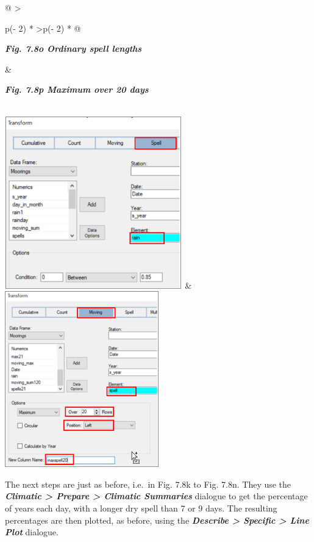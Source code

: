 \documentclass[
  letterpaper,
  DIV=11,
  numbers=noendperiod]{scrreprt}
\begin{document}
\begin{longtable}[]{@{}
  >{\raggedright\arraybackslash}p{(\columnwidth - 2\tabcolsep) * }
  >{\raggedleft\arraybackslash}p{(\columnwidth - 2\tabcolsep) * }@{}}
\toprule\noalign{}
\begin{minipage}[b]{\linewidth}\raggedright
\textbf{\emph{Fig. 7.8o Ordinary spell lengths}}
\end{minipage} & \begin{minipage}[b]{\linewidth}\raggedleft
\textbf{\emph{Fig. 7.8p Maximum over 20 days}}
\end{minipage} \\
\midrule\noalign{}
\endhead
\bottomrule\noalign{}
\endlastfoot
\includegraphics[width=3.02575in,height=2.94052in]{figures/Fig7.8o.png}
&
\includegraphics[width=2.63061in,height=2.99829in]{figures/Fig7.8p.png} \\
\end{longtable}

The next steps are just as before, i.e.~in Fig. 7.8k to Fig. 7.8n. They
use the \textbf{\emph{Climatic \textgreater{} Prepare \textgreater{}
Climatic Summaries}} dialogue to get the percentage of years each day,
with a longer dry spell than 7 or 9 days. The resulting percentages are
then plotted, as before, using the \textbf{\emph{Describe \textgreater{}
Specific \textgreater{} Line Plot}} dialogue.
\end{document}

